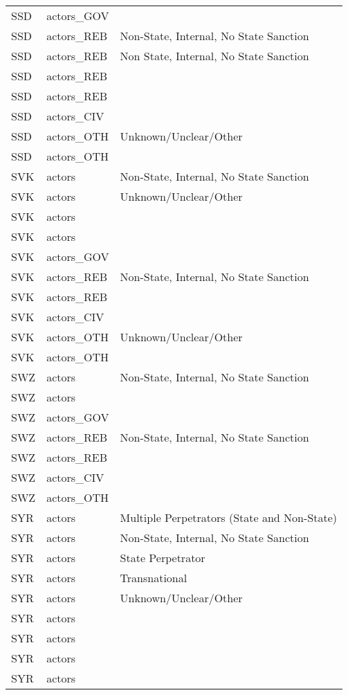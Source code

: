 \begin{table}[ht]
\begin{tabular}{lll}
  SSD & actors\_GOV &  \\ 
  SSD & actors\_REB & Non-State, Internal, No State Sanction \\ 
  SSD & actors\_REB & Non State, Internal, No State Sanction \\ 
  SSD & actors\_REB &  \\ 
  SSD & actors\_REB &  \\ 
  SSD & actors\_CIV &  \\ 
  SSD & actors\_OTH & Unknown/Unclear/Other \\ 
  SSD & actors\_OTH &  \\ 
  SVK & actors & Non-State, Internal, No State Sanction \\ 
  SVK & actors & Unknown/Unclear/Other \\ 
  SVK & actors &  \\ 
  SVK & actors &  \\ 
  SVK & actors\_GOV &  \\ 
  SVK & actors\_REB & Non-State, Internal, No State Sanction \\ 
  SVK & actors\_REB &  \\ 
  SVK & actors\_CIV &  \\ 
  SVK & actors\_OTH & Unknown/Unclear/Other \\ 
  SVK & actors\_OTH &  \\ 
  SWZ & actors & Non-State, Internal, No State Sanction \\ 
  SWZ & actors &  \\ 
  SWZ & actors\_GOV &  \\ 
  SWZ & actors\_REB & Non-State, Internal, No State Sanction \\ 
  SWZ & actors\_REB &  \\ 
  SWZ & actors\_CIV &  \\ 
  SWZ & actors\_OTH &  \\ 
  SYR & actors & Multiple Perpetrators (State and Non-State) \\ 
  SYR & actors & Non-State, Internal, No State Sanction \\ 
  SYR & actors & State Perpetrator \\ 
  SYR & actors & Transnational \\ 
  SYR & actors & Unknown/Unclear/Other \\ 
  SYR & actors &  \\ 
  SYR & actors &  \\ 
  SYR & actors &  \\ 
  SYR & actors &  \\ 

\end{tabular}
\end{table}
